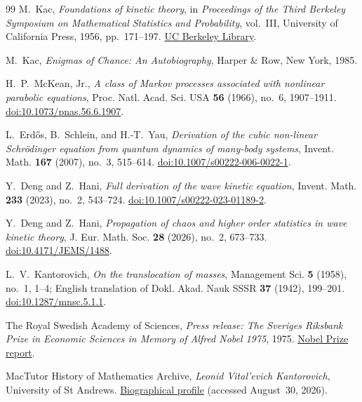 \documentclass[11pt]{amsart}
\numberwithin{equation}{section}
\theoremstyle{plain}
\begin{document}
\begin{thebibliography}{99}
M.~Kac,
\emph{Foundations of kinetic theory},
in \emph{Proceedings of the Third Berkeley Symposium on Mathematical
Statistics and Probability}, vol.~III, University of California Press,
1956, pp.~171--197.
\href{https://digicoll.lib.berkeley.edu/record/112857}
{UC Berkeley Library}.

M.~Kac,
\emph{Enigmas of Chance: An Autobiography},
Harper \& Row, New York, 1985.

H.~P.~McKean, Jr.,
\emph{A class of Markov processes associated with nonlinear parabolic
equations},
Proc. Natl. Acad. Sci. USA \textbf{56} (1966), no.~6, 1907--1911.
\href{https://doi.org/10.1073/pnas.56.6.1907}
{doi:10.1073/pnas.56.6.1907}.

L.~Erd\H{o}s, B.~Schlein, and H.-T.~Yau,
\emph{Derivation of the cubic non-linear Schr\"odinger equation from quantum
dynamics of many-body systems},
Invent. Math. \textbf{167} (2007), no.~3, 515--614.
\href{https://doi.org/10.1007/s00222-006-0022-1}
{doi:10.1007/s00222-006-0022-1}.

Y.~Deng and Z.~Hani,
\emph{Full derivation of the wave kinetic equation},
Invent. Math. \textbf{233} (2023), no.~2, 543--724.
\href{https://doi.org/10.1007/s00222-023-01189-2}
{doi:10.1007/s00222-023-01189-2}.

Y.~Deng and Z.~Hani,
\emph{Propagation of chaos and higher order statistics in wave kinetic theory},
J. Eur. Math. Soc. \textbf{28} (2026), no.~2, 673--733.
\href{https://doi.org/10.4171/JEMS/1488}{doi:10.4171/JEMS/1488}.

L.~V.~Kantorovich,
\emph{On the translocation of masses},
Management Sci. \textbf{5} (1958), no.~1, 1--4;
English translation of Dokl. Akad. Nauk SSSR \textbf{37} (1942), 199--201.
\href{https://doi.org/10.1287/mnsc.5.1.1}
{doi:10.1287/mnsc.5.1.1}.

The Royal Swedish Academy of Sciences,
\emph{Press release: The Sveriges Riksbank Prize in Economic Sciences in
Memory of Alfred Nobel 1975}, 1975.
\href{https://www.nobelprize.org/prizes/economic-sciences/1975/press-release/1000/}
{Nobel Prize report}.

MacTutor History of Mathematics Archive,
\emph{Leonid Vital'evich Kantorovich}, University of St Andrews.
\href{https://mathshistory.st-andrews.ac.uk/Biographies/Kantorovich/}
{Biographical profile} (accessed August~30, 2026).


\end{thebibliography}
\end{document}
